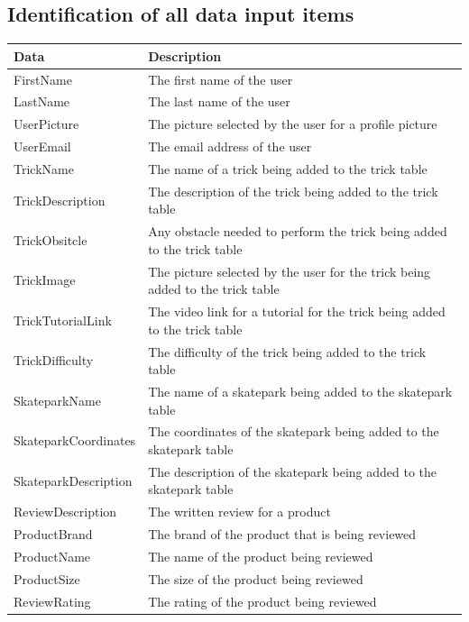 \subsection{Identification of all data input items}

\begin{center}
\begin{tabular}{|p{3.5cm}|p{5cm}|} \hline
\textbf{Data} & \textbf{Description} \\ \hline
FirstName & The first name of the user \\ \hline
LastName & The last name of the user \\ \hline
UserPicture & The picture selected by the user for a profile picture \\ \hline
UserEmail & The email address of the user \\ \hline
TrickName & The name of a trick being added to the trick table \\ \hline
TrickDescription & The description of the trick being added to the trick table \\ \hline 
TrickObsitcle & Any obstacle needed to perform the trick being added to the trick table \\ \hline
TrickImage & The picture selected by the user for the trick being added to the trick table \\ \hline
TrickTutorialLink & The video link for a tutorial for the trick being added to the trick table \\ \hline
TrickDifficulty & The difficulty of the trick being added to the trick table \\ \hline
SkateparkName & The name of a skatepark being added to the skatepark table \\ \hline
SkateparkCoordinates & The coordinates of the skatepark being added to the skatepark table \\ \hline
SkateparkDescription & The description of the skatepark being added to the skatepark table \\ \hline
ReviewDescription & The written review for a product \\ \hline
ProductBrand & The brand of the product that is being reviewed \\ \hline
ProductName & The name of the product being reviewed \\ \hline
ProductSize & The size of the product being reviewed \\ \hline
ReviewRating & The rating of the product being reviewed \\ \hline

\end{tabular}
\label{tab:Input Items}
\end{center}


